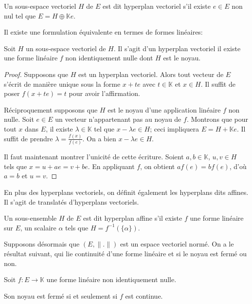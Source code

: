 \begin{df}
  Un sous-espace vectoriel $H$ de $E$ est dit hyperplan
  vectoriel s'il existe $e\in E$ non nul tel que
  $E = H\oplus \mathbb{K}e$.
\end{df}

Il existe une formulation équivalente en termes de formes linéaires:
\begin{prop}
  Soit $H$ un sous-espace vectoriel de $H$.
  Il s'agit d'un hyperplan vectoriel \ssi{} il existe une
  forme linéaire $f$ non identiquement nulle dont $H$ est
  le noyau.
\end{prop}

\begin{proof}
  Supposons que $H$ est un hyperplan vectoriel. Alors tout
  vecteur de $E$ s'écrit de manière unique sous la forme
  $x + te$ avec $t\in\mathbb{K}$ et $x\in H$.
  Il suffit de poser $f(x + te) = t$ pour avoir l'affirmation.

  Réciproquement supposons que $H$ est le noyau d'une application
  linéaire $f$ non nulle. Soit $e\in E$ un vecteur n'appartenant pas
  au noyau de $f$. Montrons que pour tout $x$ dans $E$, il existe
  $\lambda\in\mathbb{K}$ tel que $x-\lambda e\in H$;
  ceci impliquera $E = H + \mathbb{K}e$. Il suffit de prendre
  $\lambda = \frac{f(x)}{f(e)}$. On a bien $x-\lambda e\in H$.

  Il faut maintenant montrer l'unicité de cette écriture. Soient
  $a, b\in\mathbb{K}$, $u, v \in H$ tels que $x = u + ae = v+be$.
  En appliquant $f$, on obtient $af(e) = bf(e)$, d'où $a = b$
  et $u = v$.
\end{proof}

En plus des hyperplans vectoriels, on définit également les
hyperplans dits affines. Il s'agit de translatés d'hyperplans
vectoriels.
\begin{df}
  Un sous-ensemble $H$ de $E$ est dit hyperplan affine s'il
  existe $f$ une forme linéaire sur $E$, un scalaire $\alpha$
  tels que $H = f^{-1}(\{\alpha\})$.
\end{df}

Supposons désormais que $(E, \|.\|)$ est un espace vectoriel
normé. On a le résultat suivant, qui lie continuité d'une
forme linéaire et si le noyau est fermé ou non.

\begin{prop}
  Soit $f: E \to\mathbb{K}$ une forme linéaire
  non identiquement nulle.

  Son noyau est fermé si et seulement si $f$ est continue.
\end{prop}

